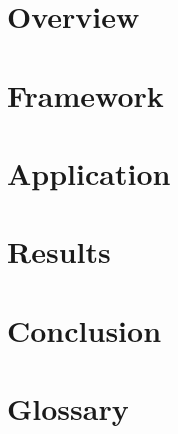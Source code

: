 \documentclass{thesis}
\begin{document}
\frontmatter
\maketitle
\clearpage
\impressum

\cleardoublepage
{}


\cleardoublepage


\tableofcontents

\mainmatter
\chapter{Overview}

\chapter{Framework}

\chapter{Application}

\chapter{Results}

\chapter{Conclusion}

\chapter*{Glossary}


\appendix
%

\backmatter

\listoffigures
\listoftables




\clearpage
\erklaerung
\end{document}
